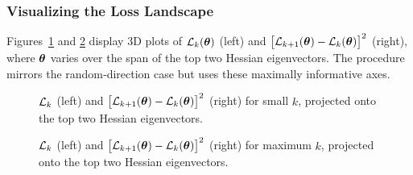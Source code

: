 \documentclass{article}
\begin{document}
\subsubsection{Visualizing the Loss Landscape}

Figures~\ref{fig:loss_eigen_small} and \ref{fig:loss_eigen_big} display 3D plots of $\mathcal{L}_k(\boldsymbol{\theta})$ (left) and 
$\bigl[ \mathcal{L}_{k+1}(\boldsymbol{\theta}) - \mathcal{L}_k(\boldsymbol{\theta}) \bigr]^2$ (right), where $\boldsymbol{\theta}$ varies over the span of the top two Hessian eigenvectors.
 The procedure mirrors the random‑direction case but uses these maximally informative axes.

\begin{figure}[!htbp]
  \hspace*{-2.2cm}
  \caption{$\mathcal{L}_k$ (left) and $\bigl[ \mathcal{L}_{k+1}(\boldsymbol{\theta}) - \mathcal{L}_k(\boldsymbol{\theta}) \bigr]^2$ (right) for small $k$, projected onto the top two Hessian eigenvectors.}
  \label{fig:loss_eigen_small}
\end{figure}

\begin{figure}[!htbp]
  \hspace*{-2.2cm}
  \caption{$\mathcal{L}_k$ (left) and $\bigl[ \mathcal{L}_{k+1}(\boldsymbol{\theta}) - \mathcal{L}_k(\boldsymbol{\theta}) \bigr]^2$ (right) for maximum $k$, projected onto the top two Hessian eigenvectors.}
  \label{fig:loss_eigen_big}
\end{figure}
\end{document}
